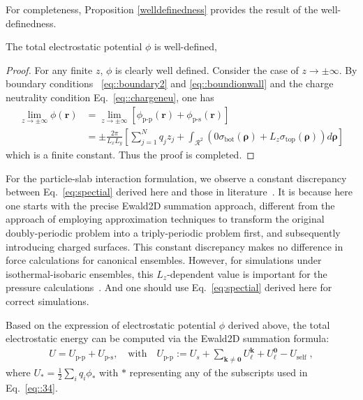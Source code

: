 For completeness, Proposition \ref{welldefinedness} provides the result of the well-definedness.
\begin{prop} \label{welldefinedness}
	The total electrostatic potential $\phi$ is well-defined, 
\end{prop}
\begin{proof}
	For any finite $z$, $\phi$ is clearly well defined. Consider the case of $z\rightarrow \pm \infty$.
	By boundary conditions ~\eqref{eq::boundary2} and \eqref{eq::boundionwall} and the charge neutrality condition Eq.~\eqref{eq::chargeneu}, one has
	\begin{equation}
		\begin{split}
			\lim_{z\rightarrow \pm \infty}\phi(\bm{r})&=\lim_{z\rightarrow \pm \infty}\left[\phi_{\text{p-p}}(\bm{r})+\phi_{\text{p-s}}(\bm{r})\right]\\
			&=\pm\frac{2\pi}{L_xL_y}\left[\sum_{j=1}^{N}q_{j}z_{j}+\int_{\mathcal{R}^2}\left(0\sigma_{\mathrm{bot}}(\bm{\rho})+L_z\sigma_{\mathrm{top}}(\bm{\rho})\right)d\bm{\rho}\right]
		\end{split}
	\end{equation}
	which is a finite constant. Thus the proof is completed.
\end{proof}

For the particle-slab interaction formulation, we observe a constant discrepancy between Eq.~\eqref{eq:spectial} derived here and those in literature~\cite{dos2017simulations,yi2017note}. 
It is because here one starts with the precise Ewald2D summation approach, different from the approach of employing approximation techniques to transform the original doubly-periodic problem into a triply-periodic problem first, and subsequently introducing charged surfaces. 
This constant discrepancy makes no difference in force calculations for canonical ensembles. 
However, for simulations under isothermal-isobaric ensembles, this $L_z$-dependent value is important for the pressure calculations~\cite{li2024noteaccuratepressurecalculations}. 
And one should use Eq.~\eqref{eq:spectial} derived here for correct simulations.

Based on the expression of electrostatic potential $\phi$ derived above, the total electrostatic energy can be computed via the Ewald2D summation formula:  
\begin{align}\label{eq::34}
	U = U_{\text{p-p}} + U_{\text{p-s}}, \quad \text{with} \quad U_{\text{p-p}} := U_{s} + \sum_{\bm{k}\neq\bm{0}}U_{\ell}^{\bm{k}}+U_{\ell}^{\bm{0}}- U_{\text{self}}\;,
\end{align}
where $U_*=\frac{1}{2}\sum_{i}q_{i}\phi_*$ with $*$ representing any of the subscripts used in Eq.~\eqref{eq::34}.
